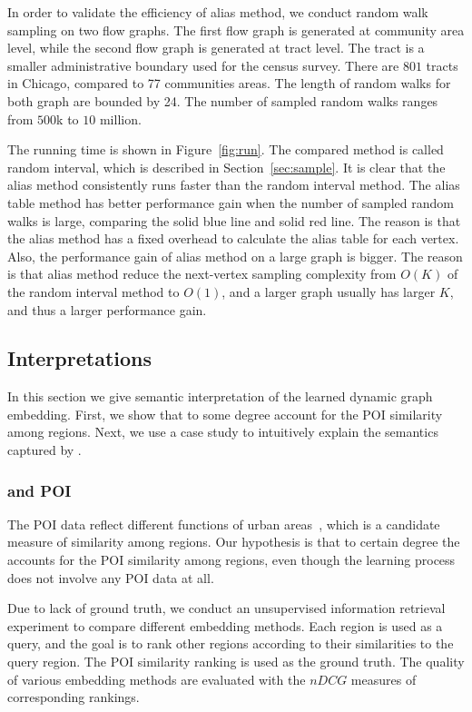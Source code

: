 In order to validate the efficiency of alias method, we conduct random walk sampling on two flow graphs. The first flow graph is generated at community area level, while the second flow graph is generated at tract level. The tract is a smaller administrative boundary used for the census survey. There are $801$ tracts in Chicago, compared to 77 communities areas. The length of random walks for both graph are bounded by 24. The number of sampled random walks ranges from $500$k to $10$ million.

The running time is shown in Figure~\ref{fig:run}. The compared method is called random interval, which is described in Section~\ref{sec:sample}. It is clear that the alias method consistently runs faster than the random interval method. The alias table method has better performance gain when the number of sampled random walks is large, comparing the solid blue line and solid red line. The reason is that the alias method has a fixed overhead to calculate the alias table for each vertex. Also, the performance gain of alias method on a large graph is bigger. The reason is that alias method reduce the next-vertex sampling complexity from $O(K)$ of the random interval method to $O(1)$, and a larger graph usually has larger $K$, and thus a larger performance gain. 




\subsection{Interpretations}

In this section we give semantic interpretation of the learned dynamic graph embedding. First, we show that \hdge to some degree account for the POI similarity among regions. Next, we use a case study to intuitively explain the semantics captured by \hdge.



\subsubsection{\hdge and POI}

The POI data reflect different functions of urban areas~\cite{yuan2012discovering}, which is a candidate measure of similarity among regions. Our hypothesis is that to certain degree the \hdge accounts for the POI similarity among regions, even though the \hdge learning process does not involve any POI data at all. 

Due to lack of ground truth, we conduct an unsupervised information retrieval experiment to compare different embedding methods. Each region is used as a query, and the goal is to rank other regions according to their similarities to the query region. The POI similarity ranking is used as the ground truth. The quality of various embedding methods are evaluated with the $nDCG$ measures of corresponding rankings.

